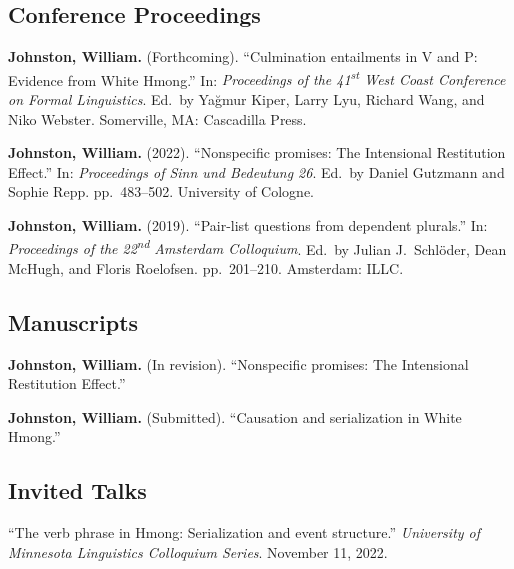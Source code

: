 \documentclass[11pt,oneside,DIV=9,parskip=off]{scrarticle} %
\newlength{\spacingbefore}
\newlength{\spacingafter}
\newcommand{\myonecol}[1]{%
	\vspace{\spacingbefore}%
	\begin{minipage}[t]{\linewidth}%
		\strut#1%
	\end{minipage}%
	\vspace{\spacingafter}\par%
	}
\newcommand{\pub}[1]{%
	\myonecol{#1}%
	}
\newcommand{\talk}[1]{%
	\myonecol{#1}%
	}
\begin{document}

\subsection{Conference Proceedings}
\pub{\textbf{Johnston, William.} (Forthcoming). ``Culmination entailments in V and P: Evidence from White Hmong.'' In: \textit{Proceedings of the 41\textsuperscript{st} West Coast Conference on Formal Linguistics}. Ed.\ by Yağmur Kiper, Larry Lyu, Richard Wang, and Niko Webster. Somerville, MA: Cascadilla Press.}
\pub{\textbf{Johnston, William.} (2022). ``Nonspecific promises: The Intensional Restitution Effect.'' In: \textit{Proceedings of Sinn und Bedeutung 26}. Ed.\ by Daniel Gutzmann and Sophie Repp. pp.\ 483--502. University of Cologne.}
\pub{\textbf{Johnston, William.} (2019). ``Pair-list questions from dependent plurals.'' In: \textit{Proceedings of the 22\textsuperscript{nd} Amsterdam Colloquium}. Ed.\ by Julian J.\ Schl\"oder, Dean McHugh, and Floris Roelofsen. pp.\ 201--210. Amsterdam: ILLC.}



\subsection{Manuscripts}
\pub{\textbf{Johnston, William.} (In revision). ``Nonspecific promises: The Intensional Restitution Effect.''}

\pub{\textbf{Johnston, William.} (Submitted). ``Causation and serialization in White Hmong.''}

\subsection{Invited Talks}
\talk{``The verb phrase in Hmong: Serialization and event structure.'' \textit{University of Minnesota Linguistics Colloquium Series}. November 11, 2022.}

\end{document}
